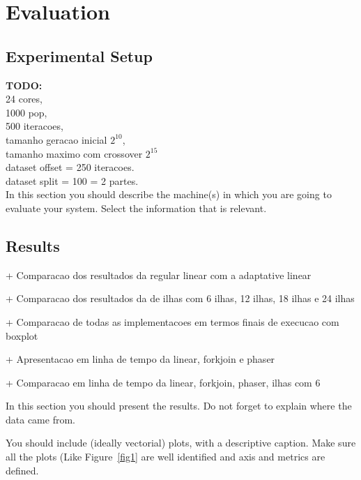 \documentclass[runningheads]{llncs}
\begin{document}
\section{Evaluation}

\subsection{Experimental Setup}
\textbf{TODO:} \\
24 cores, \\ 1000 pop,\\  500 iteracoes, \\ 
tamanho geracao inicial \(2^{10}\), \\ 
tamanho maximo com crossover \(2^{15}\) \\
dataset offset = 250 iteracoes. \\
dataset split = 100 = 2 partes. \\

In this section you should describe the machine(s) in which you are going to evaluate your system. Select the information that is relevant.


\subsection{Results}

+ Comparacao dos resultados da regular linear com a adaptative linear

+ Comparacao dos resultados da de ilhas com 6 ilhas, 12 ilhas, 18 ilhas e 24 ilhas

+ Comparacao de todas as implementacoes em termos finais de execucao com boxplot

+ Apresentacao em linha de tempo da linear, forkjoin e phaser

+ Comparacao em linha de tempo da linear, forkjoin, phaser, ilhas com 6

In this section you should present the results. Do not forget to explain where the data came from. 

You should include (ideally vectorial) plots, with a descriptive caption. Make sure all the plots (Like Figure~\ref{fig1} are well identified and axis and metrics are defined.

\end{document}
